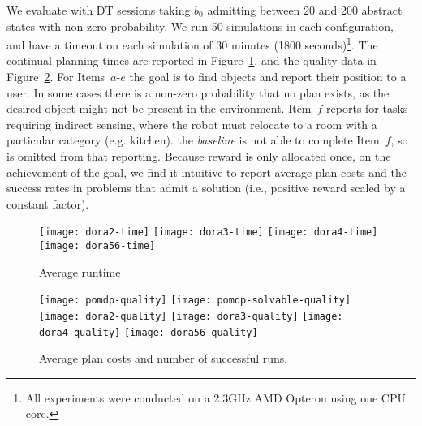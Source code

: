 We evaluate with DT sessions taking $b_0$ admitting between 20 and 200
abstract states with non-zero probability. We run 50 simulations in
each configuration, and have a timeout on each simulation of 30
minutes (1800 seconds)\footnote{All experiments were conducted on a
  2.3GHz AMD Opteron using one CPU core.}. The continual planning
times are reported in Figure~\ref{fig:results-time}, and the quality
data in Figure~\ref{fig:results-quality}.
For Items~$a$-$e$ the goal is to find objects and report their
position to a user. In some cases there is a non-zero probability that
no plan exists, as the desired object might not be present in the
environment. Item~$f$ reports for tasks requiring indirect sensing,
where the robot must relocate to a room with a particular category
(e.g. kitchen). the {\em baseline} is not able to complete Item~$f$,
so is omitted from that reporting.  Because reward is only allocated
once, on the achievement of the goal,  we find it
intuitive to report average plan costs and the success rates in
problems that admit a solution (i.e., positive reward scaled by a
constant factor).

\begin{figure}[h!]
  \texttt{[image: dora2-time]}\hfill
  \texttt{[image: dora3-time]}\hfill
  \texttt{[image: dora4-time]}\hfill
  \vspace{2mm}
  \texttt{[image: dora56-time]}\hfill
  \caption{Average runtime}
  \label{fig:results-time}
\end{figure}

\begin{figure}[h!]
  \texttt{[image: pomdp-quality]}\hfill
  \texttt{[image: pomdp-solvable-quality]}\hfill
  \texttt{[image: dora2-quality]}\hfill
  \texttt{[image: dora3-quality]}\hfill
  \texttt{[image: dora4-quality]}\hfill
  \vspace{2mm}
  \texttt{[image: dora56-quality]}\hfill
  \caption{Average plan costs and number of successful runs.}
  \label{fig:results-quality}
\end{figure}


